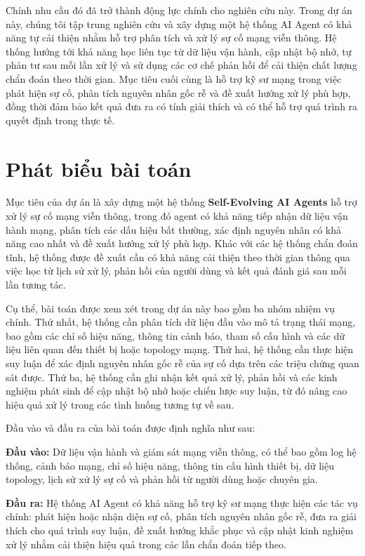 Chính nhu cầu đó đã trở thành động lực chính cho nghiên cứu này. Trong dự án này, chúng tôi tập trung nghiên cứu và xây dựng một hệ thống AI Agent có khả năng tự cải thiện nhằm hỗ trợ phân tích và xử lý sự cố mạng viễn thông. Hệ thống hướng tới khả năng học liên tục từ dữ liệu vận hành, cập nhật bộ nhớ, tự phản tư sau mỗi lần xử lý và sử dụng các cơ chế phản hồi để cải thiện chất lượng chẩn đoán theo thời gian. Mục tiêu cuối cùng là hỗ trợ kỹ sư mạng trong việc phát hiện sự cố, phân tích nguyên nhân gốc rễ và đề xuất hướng xử lý phù hợp, đồng thời đảm bảo kết quả đưa ra có tính giải thích và có thể hỗ trợ quá trình ra quyết định trong thực tế.

\section{Phát biểu bài toán}
\label{sec:prob-statement}

Mục tiêu của dự án là xây dựng một hệ thống \textbf{Self-Evolving AI Agents} hỗ trợ xử lý sự cố mạng viễn thông, trong đó agent có khả năng tiếp nhận dữ liệu vận hành mạng, phân tích các dấu hiệu bất thường, xác định nguyên nhân có khả năng cao nhất và đề xuất hướng xử lý phù hợp. Khác với các hệ thống chẩn đoán tĩnh, hệ thống được đề xuất cần có khả năng cải thiện theo thời gian thông qua việc học từ lịch sử xử lý, phản hồi của người dùng và kết quả đánh giá sau mỗi lần tương tác.

Cụ thể, bài toán được xem xét trong dự án này bao gồm ba nhóm nhiệm vụ chính. Thứ nhất, hệ thống cần phân tích dữ liệu đầu vào mô tả trạng thái mạng, bao gồm các chỉ số hiệu năng, thông tin cảnh báo, tham số cấu hình và các dữ liệu liên quan đến thiết bị hoặc topology mạng. Thứ hai, hệ thống cần thực hiện suy luận để xác định nguyên nhân gốc rễ của sự cố dựa trên các triệu chứng quan sát được. Thứ ba, hệ thống cần ghi nhận kết quả xử lý, phản hồi và các kinh nghiệm phát sinh để cập nhật bộ nhớ hoặc chiến lược suy luận, từ đó nâng cao hiệu quả xử lý trong các tình huống tương tự về sau.

Đầu vào và đầu ra của bài toán được định nghĩa như sau:

\textbf{Đầu vào:} Dữ liệu vận hành và giám sát mạng viễn thông, có thể bao gồm log hệ thống, cảnh báo mạng, chỉ số hiệu năng, thông tin cấu hình thiết bị, dữ liệu topology, lịch sử xử lý sự cố và phản hồi từ người dùng hoặc chuyên gia.

\textbf{Đầu ra:} Hệ thống AI Agent có khả năng hỗ trợ kỹ sư mạng thực hiện các tác vụ chính: phát hiện hoặc nhận diện sự cố, phân tích nguyên nhân gốc rễ, đưa ra giải thích cho quá trình suy luận, đề xuất hướng khắc phục và cập nhật kinh nghiệm xử lý nhằm cải thiện hiệu quả trong các lần chẩn đoán tiếp theo.

